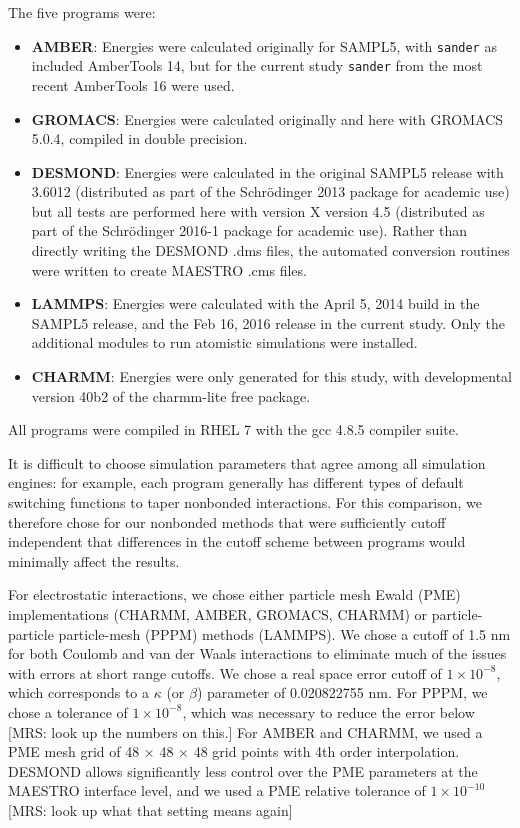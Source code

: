 The five programs were:
\begin{itemize} 
\item {\bf AMBER}: Energies were calculated originally for SAMPL5, with
  {\tt sander} as included AmberTools 14, but for the current study
  {\tt sander} from the most recent AmberTools 16 were used.
\item {\bf GROMACS}: Energies were calculated originally and here with
  GROMACS 5.0.4, compiled in double precision.
\item {\bf DESMOND}: Energies were calculated in the original
  SAMPL5 release with 3.6012 (distributed as part of the Schr\"odinger
  2013 package for academic use) but all tests are performed here with
  version X version 4.5 (distributed as part of the Schr\"odinger
  2016-1 package for academic use).  Rather than directly writing the
  DESMOND .dms files, the automated conversion routines were written to
  create MAESTRO .cms files.
\item {\bf LAMMPS}: Energies were calculated with the April 5,
  2014 build in the SAMPL5 release, and the Feb 16, 2016 release in
  the current study. Only the additional modules to run atomistic
  simulations were installed.
\item {\bf CHARMM}: Energies were only generated for this study, with
  developmental version 40b2 of the charmm-lite free package.
\end{itemize}

All programs were compiled in RHEL 7 with the gcc 4.8.5 compiler
suite.

It is difficult to choose simulation parameters that agree among all
simulation engines: for example, each program generally has different
types of default switching functions to taper nonbonded
interactions. For this comparison, we therefore chose for our
nonbonded methods that were sufficiently cutoff independent that
differences in the cutoff scheme between programs would minimally
affect the results.

For electrostatic interactions, we chose either particle mesh Ewald
(PME) implementations (CHARMM, AMBER, GROMACS, CHARMM) or
particle-particle particle-mesh (PPPM) methods (LAMMPS). We chose a
cutoff of 1.5 nm for both Coulomb and van der Waals interactions to
eliminate much of the issues with errors at short range cutoffs. We
chose a real space error cutoff of $1\times 10^{-8}$, which corresponds
to a $\kappa$ (or $\beta$) parameter of 0.020822755 nm.  For PPPM, we
chose a tolerance of $1\times10^{-8}$, which was necessary to reduce
the error below [MRS: look up the numbers on this.] For AMBER and
CHARMM, we used a PME mesh grid of 48 $\times$ 48 $\times$ 48 grid
points with 4th order interpolation. DESMOND allows significantly less
control over the PME parameters at the MAESTRO interface level, and we
used a PME relative tolerance of $1\times 10^{-10}$ [MRS: look up what
  that setting means again]

